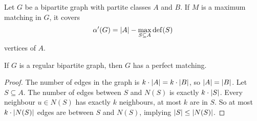 \begin{theorem}
  Let $G$ be a bipartite graph with partite classes $A$ and $B$.
  If $M$ is a maximum matching in $G$, it covers
  \[
	\alpha'(G) = \left| A \right| - \max_{S \subseteq A} \operatorname{def}(S)
  \]
  vertices of $A$.
\end{theorem}

\begin{theorem}
  If $G$ is a regular bipartite graph, then $G$ has a perfect matching.
\end{theorem}

\begin{proof}
  The number of edges in the graph is $k \cdot \left| A \right| = k \cdot \left| B \right|$, so
  $\left| A \right| = \left| B \right|$.
  Let $S \subseteq A$.
  The number of edges between $S$ and $N(S)$ is exactly $k \cdot \left| S \right|$.
  Every neighbour $u \in N(S)$ has exactly $k$ neighbours, at most $k$ are in
  $S$.
  So at most $k \cdot \left| N(S) \right|$ edges are between $S$ and $N(S)$, implying
  $\left| S \right| \le \left| N(S) \right|$.
\end{proof}



